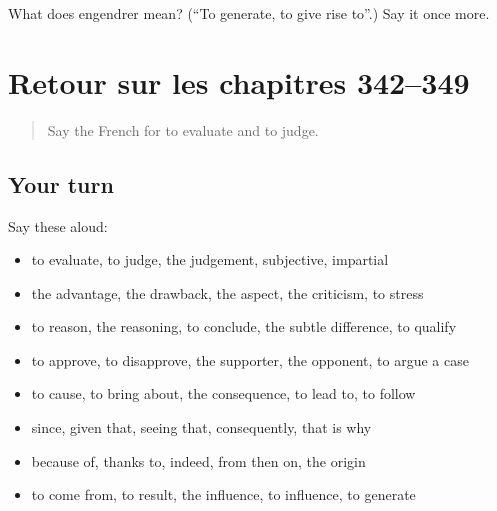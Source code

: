 \begin{tcolorbox}[breakable,colback=teal!4,colframe=teal!35!black,title={Before you move on}]
What does engendrer mean? (\textquotedblleft{}To generate, to give rise to\textquotedblright{}.) Say it once more.
\end{tcolorbox}
\section[(dialogue)]{Retour sur les chapitres 342–349}

\label{lesson:FR-R349-revision-342-349}



\begin{quote}
Say the French for to evaluate and to judge.
\end{quote}

\subsection*{Your turn}
Say these aloud:

\begin{itemize}
\raggedright
  \item to evaluate, to judge, the judgement, subjective, impartial
  \item the advantage, the drawback, the aspect, the criticism, to stress
  \item to reason, the reasoning, to conclude, the subtle difference, to qualify
  \item to approve, to disapprove, the supporter, the opponent, to argue a case
  \item to cause, to bring about, the consequence, to lead to, to follow
  \item since, given that, seeing that, consequently, that is why
  \item because of, thanks to, indeed, from then on, the origin
  \item to come from, to result, the influence, to influence, to generate
\end{itemize}

